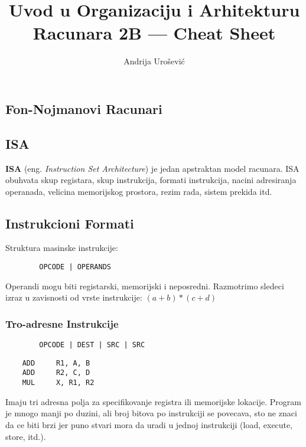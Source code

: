 \documentclass[12p,a4paper]{article}
\title{Uvod u Organizaciju i Arhitekturu Racunara 2B --- Cheat Sheet}
\author{Andrija Urošević}
\begin{document}
\maketitle

\begin{multicols}{2}


    \section{Fon-Nojmanovi Racunari}

    \subsection{ISA}

    \textbf{ISA} (eng. \emph{Instruction Set Architecture}) je jedan apstraktan
    model racunara. ISA obuhvata skup registara, skup instrukcija, formati 
    instrukcija, nacini adresiranja operanada, velicina memorijskog prostora,
    rezim rada, sistem prekida itd.

    \subsection{Instrukcioni Formati}

    Struktura masinske instrukcije:
    \begin{lstlisting}
        OPCODE | OPERANDS  
    \end{lstlisting}

    Operandi mogu biti registarski, memorijski i neposredni.
    Razmotrimo sledeci izraz u zavisnosti od vrste instrukcije: 
    $(a + b) * (c + d)$

    \subsubsection{Tro-adresne Instrukcije}

    \begin{lstlisting}
        OPCODE | DEST | SRC | SRC
    \end{lstlisting}
    \begin{lstlisting}
    ADD     R1, A, B
    ADD     R2, C, D
    MUL     X, R1, R2
    \end{lstlisting}

    Imaju tri adresna polja za specifikovanje registra ili memorijske lokacije.
    Program je mnogo manji po duzini, ali broj bitova po instrukciji se 
    povecava, sto ne znaci da ce biti brzi jer puno stvari mora da uradi
    u jednoj instrukciji (load, execute, store, itd.).


\end{multicols}
\end{document}
